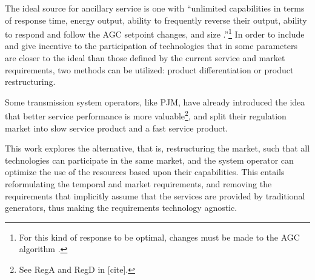 



The ideal source for ancillary service is one with ``unlimited capabilities in terms of response time, energy output, ability to frequently reverse their output, ability to respond and follow the AGC setpoint changes, and size .''\cite{makarov2008assessing}\footnote{For this kind of response to be optimal, changes must be made to the AGC algorithm \cite{peydayesh2012effects}.} In order to include and give incentive to the participation of technologies that in some parameters are closer to the ideal than those defined by the current service and market requirements, two methods can be utilized: product differentiation or product restructuring.

Some transmission system operators, like PJM, have already introduced the idea that better service performance is more valuable\footnote{See RegA and RegD in [cite].}, and split their regulation market into slow service product and a fast service product. 

This work explores the alternative, that is, restructuring the market, such that all technologies can participate in the same market, and the system operator can optimize the use of the resources based upon their capabilities. This entails reformulating the temporal and market requirements, and removing the requirements that implicitly assume that the services are provided by traditional generators, thus making the requirements technology agnostic.

